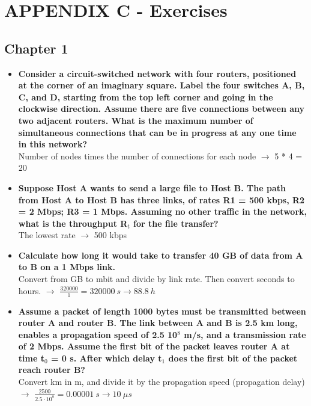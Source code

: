 \documentclass{article}
\begin{document}
\newpage

\section{APPENDIX C - Exercises}

\subsection{Chapter 1}
\begin{itemize}
	\item \textbf{Consider a circuit-switched network with four routers, positioned at the corner of an imaginary square. Label the four switches A, B, C, and D, starting from the top left corner and going in the clockwise direction. Assume there are five connections between any two adjacent routers. What is the maximum number of simultaneous connections that can be in progress at any one time in this network?}
	\vspace{.2cm} \\
	Number of nodes times the number of connections for each node $\rightarrow$ 5 * 4 = 20
	
	\item \textbf{Suppose Host A wants to send a large file to Host B. The path from Host A to Host B has three links, of rates R1 = 500 kbps, R2 = 2 Mbps; R3 = 1 Mbps. Assuming no other traffic in the network, what is the throughput R$_t$ for the file transfer?}
	\vspace{.2cm} \\
	The lowest rate $\rightarrow$ 500 kbps
	
	\item \textbf{Calculate how long it would take to transfer 40 GB of data from A to B on a 1 Mbps link.}
	\vspace{.2cm} \\
	Convert from GB to mbit and divide by link rate. Then convert seconds to hours. $\rightarrow$ $\frac{320000}{1} = 320000~s \rightarrow 88.8~h$
	
	\item \textbf{Assume a packet of length 1000 bytes must be transmitted between router A and router B. The link between A and B is 2.5 km long, enables a propagation speed of 2.5 10$^8$ m/s, and a transmission rate of 2 Mbps. Assume the first bit of the packet leaves router A at time t$_0$ = 0 s. After which delay t$_1$ does the first bit of the packet reach router B?}
	\vspace{.2cm} \\
	Convert km in m, and divide it by the propagation speed (propagation delay) $\rightarrow$ $\frac{2500}{2.5 \cdot 10^8} = 0.00001~s \rightarrow 10~\mu s$
	

\end{itemize}
\end{document}
